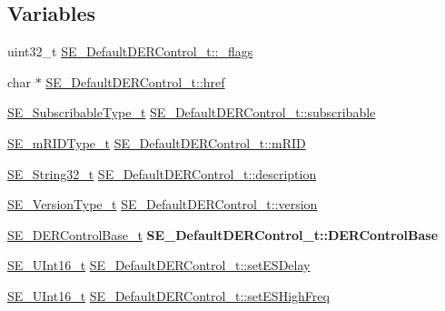 \subsection*{Variables}
\begin{DoxyCompactItemize}
\item 
uint32\+\_\+t \hyperlink{group__DefaultDERControl_ga08511ed7222a49228f0f66ca52404d0a}{S\+E\+\_\+\+Default\+D\+E\+R\+Control\+\_\+t\+::\+\_\+flags}
\item 
char $\ast$ \hyperlink{group__DefaultDERControl_ga2b9afee29d9b310f43c79c02784aec36}{S\+E\+\_\+\+Default\+D\+E\+R\+Control\+\_\+t\+::href}
\item 
\hyperlink{group__SubscribableType_ga5c41f553d369710ed34619266bf2551e}{S\+E\+\_\+\+Subscribable\+Type\+\_\+t} \hyperlink{group__DefaultDERControl_gaa16d98b386c11e56b2fde9a1c3c35847}{S\+E\+\_\+\+Default\+D\+E\+R\+Control\+\_\+t\+::subscribable}
\item 
\hyperlink{group__mRIDType_gac74622112f3a388a2851b2289963ba5e}{S\+E\+\_\+m\+R\+I\+D\+Type\+\_\+t} \hyperlink{group__DefaultDERControl_ga9fd3df30cd25ccd0cb3cf1d0f52cefc8}{S\+E\+\_\+\+Default\+D\+E\+R\+Control\+\_\+t\+::m\+R\+ID}
\item 
\hyperlink{group__String32_gac9f59b06b168b4d2e0d45ed41699af42}{S\+E\+\_\+\+String32\+\_\+t} \hyperlink{group__DefaultDERControl_gacf738db006103c920780851a581a7029}{S\+E\+\_\+\+Default\+D\+E\+R\+Control\+\_\+t\+::description}
\item 
\hyperlink{group__VersionType_ga4b8d27838226948397ed99f67d46e2ae}{S\+E\+\_\+\+Version\+Type\+\_\+t} \hyperlink{group__DefaultDERControl_ga2f2e8ea1c9828a1cdbc5080cd39e008f}{S\+E\+\_\+\+Default\+D\+E\+R\+Control\+\_\+t\+::version}
\item 
\mbox{\label{group__DefaultDERControl_gad2b2941a04006816c489bfd9cad72df1}} 
\hyperlink{structSE__DERControlBase__t}{S\+E\+\_\+\+D\+E\+R\+Control\+Base\+\_\+t} {\bfseries S\+E\+\_\+\+Default\+D\+E\+R\+Control\+\_\+t\+::\+D\+E\+R\+Control\+Base}
\item 
\hyperlink{group__UInt16_gac68d541f189538bfd30cfaa712d20d29}{S\+E\+\_\+\+U\+Int16\+\_\+t} \hyperlink{group__DefaultDERControl_gaa0f2150f5f549dc78c64e2c247e49347}{S\+E\+\_\+\+Default\+D\+E\+R\+Control\+\_\+t\+::set\+E\+S\+Delay}
\item 
\hyperlink{group__UInt16_gac68d541f189538bfd30cfaa712d20d29}{S\+E\+\_\+\+U\+Int16\+\_\+t} \hyperlink{group__DefaultDERControl_ga9b1cda2efced0f19df2502dab08ce4b0}{S\+E\+\_\+\+Default\+D\+E\+R\+Control\+\_\+t\+::set\+E\+S\+High\+Freq}

\end{DoxyCompactItemize}
